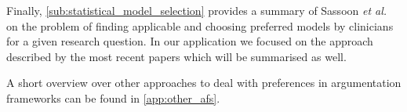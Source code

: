 Finally, \autoref{sub:statistical_model_selection} provides a summary of Sassoon \textit{et al.} \cite{sassoon2014} on the problem of finding applicable and choosing preferred models by clinicians for a given research question. In our application we focused on the approach described by the most recent papers \cite{sassoon2016,sassoon2016CD} which will be summarised as well.





A short overview over other approaches to deal with preferences in argumentation frameworks can be found in \autoref{app:other_afs}. 


% 
